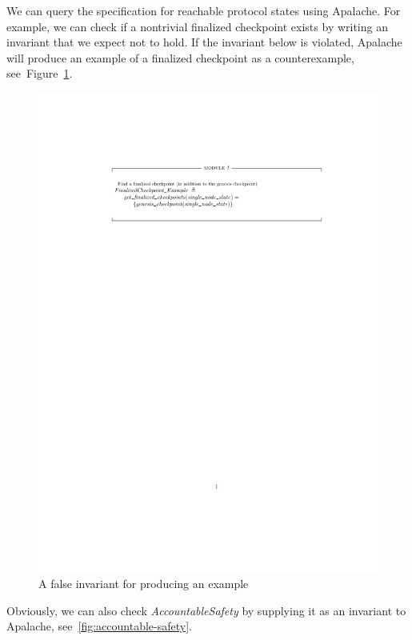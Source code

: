 We can query the specification for reachable protocol states using Apalache.
For example, we can check if a nontrivial finalized checkpoint exists by writing an
invariant that we expect not to hold. If the invariant below is violated,
Apalache will produce an example of a finalized checkpoint as a counterexample,
see~Figure~\ref{fig:finalized-example}.

\begin{figure}[h]
  \includegraphics[width=\textwidth]{images/finalized-example.pdf}
  \caption{A false invariant for producing an example}%
  \label{fig:finalized-example}
\end{figure}

Obviously, we can also check \textit{AccountableSafety} by supplying it as an
invariant to Apalache, see~\ref{fig:accountable-safety}.

